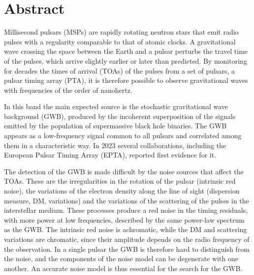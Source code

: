 \documentclass[12pt, oneside]{MastersDoctoralThesis}
\begin{document}
\chapter*{Abstract}

Millisecond pulsars (MSPs) are rapidly rotating neutron stars that emit
radio pulses with a regularity comparable to that of atomic clocks. A
gravitational wave crossing the space between the Earth and a pulsar
perturbs the travel time of the pulses, which arrive slightly earlier or
later than predicted. By monitoring for decades the times of arrival
(TOAs) of the pulses from a set of pulsars, a pulsar timing array (PTA),
it is therefore possible to observe gravitational waves with frequencies
of the order of nanohertz.

In this band the main expected source is the stochastic gravitational wave
background (GWB), produced by the incoherent superposition of the signals
emitted by the population of supermassive black hole binaries. The GWB
appears as a low-frequency signal common to all pulsars and correlated
among them in a characteristic way. In 2023 several collaborations,
including the European Pulsar Timing Array (EPTA), reported first evidence
for it.

The detection of the GWB is made difficult by the noise sources that
affect the TOAs. These are the irregularities in the rotation of the
pulsar (intrinsic red noise), the variations of the electron density along
the line of sight (dispersion measure, DM, variations) and the variations
of the scattering of the pulses in the interstellar medium. These
processes produce a red noise in the timing residuals, with more power at
low frequencies, described by the same power-law spectrum as the GWB. The
intrinsic red noise is achromatic, while the DM and scattering variations
are chromatic, since their amplitude depends on the radio frequency of the
observation. In a single pulsar the GWB is therefore hard to distinguish
from the noise, and the components of the noise model can be degenerate
with one another. An accurate noise model is thus essential for the search
for the GWB.
\end{document}
